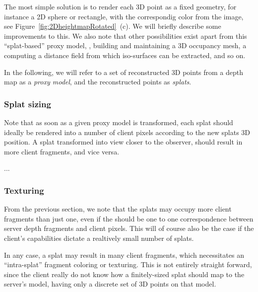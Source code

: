 The most simple solution is to render each 3D point as a fixed geometry, for
instance a 2D sphere or rectangle, with the correspondig color from the image,
see Figure~\ref{fig:2DheightmapRotated}~(c). We will briefly describe some
improvements to this. We also note that other possibilities exist apart
from this ``splat-based'' proxy model, \eg, building and maintaining a 3D
occupancy mesh, a computing a distance field from which iso-surfaces can be
extracted, and so on.

In the following, we will refer to a set of reconstructed 3D points from a depth
map as a {\em proxy model}, and the reconstructed points as {\em splats}.

\subsubsection{Splat sizing}

Note that as soon as a given proxy model is transformed, each splat should
ideally be rendered into a number of client pixels according to the new splats
3D position. A splat transformed into view closer to the observer, should result
in more client fragments, and vice versa. 

...



\subsubsection{Texturing}

From the previous section, we note that the splats may occupy more client
fragments than just one, even if the should be one to one correspondence between
server depth fragments and client pixels. This will of course also be the case
if the client's capabilities dictate a realtively small number of splats.

In any case, a splat may result in many client fragments, which necessitates an
``intra-splat'' fragment coloring or texturing. This is not entirely straight
forward, since the client really do not know how a finitely-sized splat should
map to the server's model, having only a discrete set of 3D points on that
model.

\vspace{10cm}

